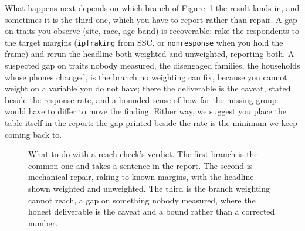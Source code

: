 \documentclass[
    a4paper,
    fontsize=10pt,
    twoside=true,
    numbers=noenddot,
]{kaobook}
\begin{document}
What happens next depends on which branch of Figure~\ref{fig:ch05-reachtree} the result lands in, and sometimes it is the third one, which you have to report rather than repair. A gap on traits you observe (site, race, age band) is recoverable: rake the respondents to the target margins (\texttt{ipfraking} from SSC, or \texttt{nonresponse} when you hold the frame) and rerun the headline both weighted and unweighted, reporting both. A suspected gap on traits nobody measured, the disengaged families, the households whose phones changed, is the branch no weighting can fix, because you cannot weight on a variable you do not have; there the deliverable is the caveat, stated beside the response rate, and a bounded sense of how far the missing group would have to differ to move the finding. Either way, we suggest you place the table itself in the report: the gap printed beside the rate is the minimum we keep coming back to.

\begin{figure}[htbp]
\centering
{}
\caption[What to do with a reach check's verdict]{What to do with a reach check's verdict. The first branch is the common one and takes a sentence in the report. The second is mechanical repair, raking to known margins, with the headline shown weighted and unweighted. The third is the branch weighting cannot reach, a gap on something nobody measured, where the honest deliverable is the caveat and a bound rather than a corrected number.}
\label{fig:ch05-reachtree}
\end{figure}
\end{document}
